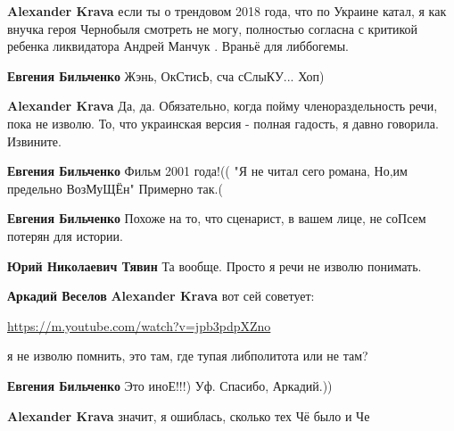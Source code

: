 \begin{itemize}
\begin{itemize} %
\textbf{Alexander Krava} если ты о трендовом 2018 года, что по Украине катал, я как внучка героя Чернобыля смотреть не могу, полностью согласна с критикой ребенка ликвидатора Андрей Манчук . Враньё для либбогемы.

\textbf{Евгения Бильченко} Жэнь, ОкСтисЬ, сча сСлыКУ... Хоп)


\textbf{Alexander Krava} Да, да. Обязательно, когда пойму членораздельность речи, пока не изволю. То, что украинская версия - полная гадость, я давно говорила. Извините.

\textbf{Евгения Бильченко} Фильм 2001 года!((
"Я не читал сего романа,
Но,им предельно ВозМуЩЁн" Примерно так.(

\textbf{Евгения Бильченко} Похоже на то, что сценарист, в вашем лице, не соПсем потерян для истории.

\textbf{Юрий Николаевич Тявин} Та вообще. Просто я речи не изволю понимать.


\textbf{Аркадий Веселов} \textbf{Alexander Krava} вот сей советует: 

\url{https://m.youtube.com/watch?v=jpb3pdpXZno} 

я не изволю помнить, это там, где тупая либполитота или не там?

\textbf{Евгения Бильченко} Это иноЕ!!!) Уф. Спасибо, Аркадий.))


\textbf{Alexander Krava} значит, я ошиблась, сколько тех Чё было и Че
\end{itemize} %


\end{itemize} %
